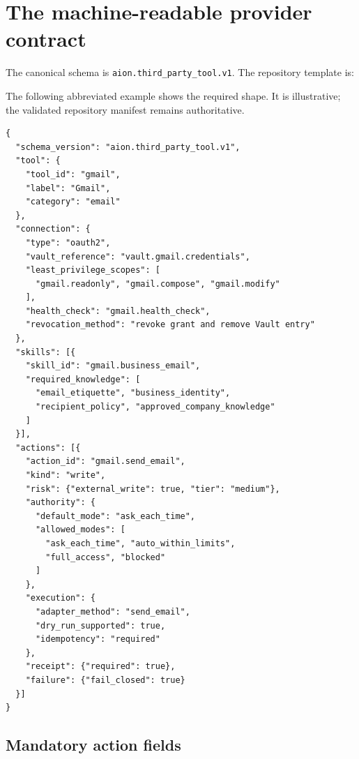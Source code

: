 \documentclass[11pt,a4paper]{article}
\newcommand{\code}[1]{\texttt{#1}}
\begin{document}
\section{The machine-readable provider contract}

The canonical schema is \code{aion.third\_party\_tool.v1}. The repository
template is:

\begin{center}
\end{center}

The following abbreviated example shows the required shape. It is illustrative;
the validated repository manifest remains authoritative.

\begin{lstlisting}
{
  "schema_version": "aion.third_party_tool.v1",
  "tool": {
    "tool_id": "gmail",
    "label": "Gmail",
    "category": "email"
  },
  "connection": {
    "type": "oauth2",
    "vault_reference": "vault.gmail.credentials",
    "least_privilege_scopes": [
      "gmail.readonly", "gmail.compose", "gmail.modify"
    ],
    "health_check": "gmail.health_check",
    "revocation_method": "revoke grant and remove Vault entry"
  },
  "skills": [{
    "skill_id": "gmail.business_email",
    "required_knowledge": [
      "email_etiquette", "business_identity",
      "recipient_policy", "approved_company_knowledge"
    ]
  }],
  "actions": [{
    "action_id": "gmail.send_email",
    "kind": "write",
    "risk": {"external_write": true, "tier": "medium"},
    "authority": {
      "default_mode": "ask_each_time",
      "allowed_modes": [
        "ask_each_time", "auto_within_limits",
        "full_access", "blocked"
      ]
    },
    "execution": {
      "adapter_method": "send_email",
      "dry_run_supported": true,
      "idempotency": "required"
    },
    "receipt": {"required": true},
    "failure": {"fail_closed": true}
  }]
}
\end{lstlisting}

\subsection{Mandatory action fields}
\end{document}
